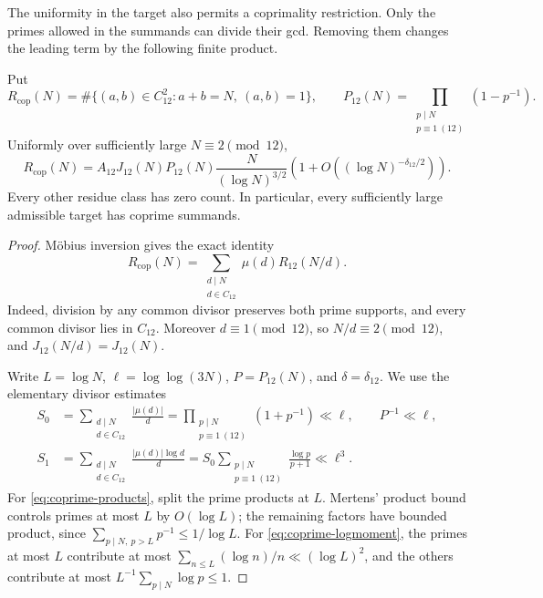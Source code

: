 The uniformity in the target also permits a coprimality restriction.
Only the primes allowed in the summands can divide their gcd.
Removing them changes the leading term by the following finite product.
\begin{corollary}\label{cor:coprime-c12}
Put
\[
 R_{\mathrm{cop}}(N)=\#\{(a,b)\in C_{12}^2:a+b=N,\ (a,b)=1\},
 \qquad
 P_{12}(N)=\prod_{\substack{p\mid N\\p\equiv1\ (12)}}(1-p^{-1}).
\]
Uniformly over sufficiently large \(N\equiv2\pmod{12}\),
\[
 R_{\mathrm{cop}}(N)
 =A_{12}J_{12}(N)P_{12}(N)\frac{N}{(\log N)^{3/2}}
       \left(1+O((\log N)^{-\delta_{12}/2})\right).
\]
Every other residue class has zero count. In particular, every
sufficiently large admissible target has coprime summands.
\end{corollary}
\begin{proof}
M\"obius inversion gives the exact identity
\begin{equation}\label{eq:coprime-inversion}
 R_{\mathrm{cop}}(N)
 =\sum_{\substack{d\mid N\\d\in C_{12}}}\mu(d)R_{12}(N/d).
\end{equation}
Indeed, division by any common divisor preserves both prime supports,
and every common divisor lies in \(C_{12}\). Moreover \(d\equiv1\pmod{12}\),
so \(N/d\equiv2\pmod{12}\), and
\(J_{12}(N/d)=J_{12}(N)\).

Write \(L=\log N\), \(\ell=\log\log(3N)\),
\(P=P_{12}(N)\), and \(\delta=\delta_{12}\).
We use the elementary divisor estimates
\begin{align}
 S_0&=\sum_{\substack{d\mid N\\d\in C_{12}}}\frac{|\mu(d)|}{d}
       =\prod_{\substack{p\mid N\\p\equiv1\ (12)}}(1+p^{-1})
       \ll\ell,\qquad P^{-1}\ll\ell,\label{eq:coprime-products}\\
 S_1&=\sum_{\substack{d\mid N\\d\in C_{12}}}
                          \frac{|\mu(d)|\log d}{d}
       =S_0\sum_{\substack{p\mid N\\p\equiv1\ (12)}}
                                     \frac{\log p}{p+1}
       \ll\ell^3.\label{eq:coprime-logmoment}
\end{align}
For \eqref{eq:coprime-products}, split the prime products at \(L\).
Mertens' product bound controls primes at most \(L\) by \(O(\log L)\);
the remaining factors have bounded product, since
\(\sum_{p\mid N,\ p>L}p^{-1}\le1/\log L\).
For \eqref{eq:coprime-logmoment}, the primes at most \(L\) contribute
at most \(\sum_{n\le L}(\log n)/n\ll(\log L)^2\), and the others
contribute at most \(L^{-1}\sum_{p\mid N}\log p\le1\).


\end{proof}
